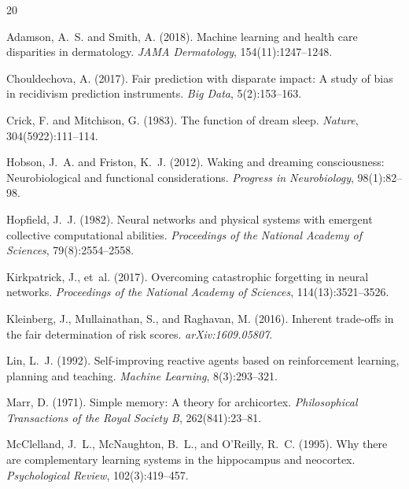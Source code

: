 \documentclass[11pt,a4paper]{article}
\begin{document}
\begin{thebibliography}{20}

Adamson, A.~S. and Smith, A. (2018).
\newblock Machine learning and health care disparities in dermatology.
\newblock \emph{JAMA Dermatology}, 154(11):1247--1248.

Chouldechova, A. (2017).
\newblock Fair prediction with disparate impact: A study of bias in recidivism prediction instruments.
\newblock \emph{Big Data}, 5(2):153--163.

Crick, F. and Mitchison, G. (1983).
\newblock The function of dream sleep.
\newblock \emph{Nature}, 304(5922):111--114.

Hobson, J.~A. and Friston, K.~J. (2012).
\newblock Waking and dreaming consciousness: Neurobiological and functional considerations.
\newblock \emph{Progress in Neurobiology}, 98(1):82--98.

Hopfield, J.~J. (1982).
\newblock Neural networks and physical systems with emergent collective computational abilities.
\newblock \emph{Proceedings of the National Academy of Sciences}, 79(8):2554--2558.

Kirkpatrick, J., et~al. (2017).
\newblock Overcoming catastrophic forgetting in neural networks.
\newblock \emph{Proceedings of the National Academy of Sciences}, 114(13):3521--3526.

Kleinberg, J., Mullainathan, S., and Raghavan, M. (2016).
\newblock Inherent trade-offs in the fair determination of risk scores.
\newblock \emph{arXiv:1609.05807}.

Lin, L.~J. (1992).
\newblock Self-improving reactive agents based on reinforcement learning, planning and teaching.
\newblock \emph{Machine Learning}, 8(3):293--321.

Marr, D. (1971).
\newblock Simple memory: A theory for archicortex.
\newblock \emph{Philosophical Transactions of the Royal Society B}, 262(841):23--81.

McClelland, J.~L., McNaughton, B.~L., and O'Reilly, R.~C. (1995).
\newblock Why there are complementary learning systems in the hippocampus and neocortex.
\newblock \emph{Psychological Review}, 102(3):419--457.


\end{thebibliography}
\end{document}
